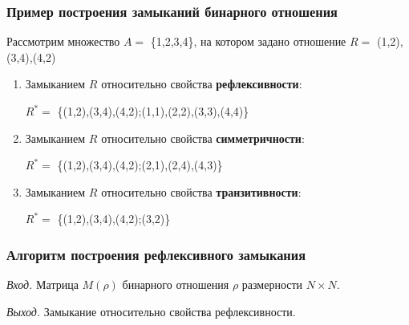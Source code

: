 \documentclass[bachelor, och, labwork]{shiza}
\begin{document}
\subsubsection{Пример построения замыканий бинарного отношения}

Рассмотрим множество $A=$ \{1,2,3,4\}, на котором задано отношение 
$R=$ {(1,2),(3,4),(4,2)} 

\begin{enumerate}

    \item Замыканием $R$ относительно свойства \textbf{рефлексивности}:
        \begin{center}

            $R^*=$ \{(1,2),(3,4),(4,2);(1,1),(2,2),(3,3),(4,4)\} 
        
        \end{center}
  
    \item Замыканием $R$ относительно свойства \textbf{симметричности}: 
        \begin{center}
    
            $R^*=$ \{(1,2),(3,4),(4,2);(2,1),(2,4),(4,3)\} 
    
        \end{center}
  
    \item Замыканием $R$ относительно свойства \textbf{транзитивности}: 
        \begin{center}
        
            $R^*=$ \{(1,2),(3,4),(4,2);(3,2)\} 
        
        \end{center}

\end{enumerate}



\subsubsection{Алгоритм построения рефлексивного замыкания}


\textit{Вход.} Матрица $M(\rho)$ бинарного отношения $\rho$ размерности
$N \times N$.

\textit{Выход.} Замыкание относительно свойства рефлексивности.
\end{document}
